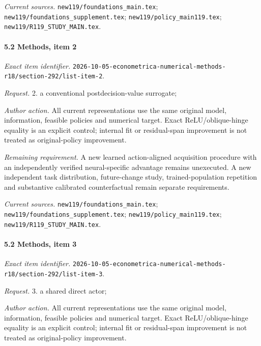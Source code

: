 \par\emph{Current sources.} \nolinkurl{new119/foundations_main.tex}; \nolinkurl{new119/foundations_supplement.tex}; \nolinkurl{new119/policy_main119.tex}; \nolinkurl{new119/R119_STUDY_MAIN.tex}.

\paragraph{5.2 Methods, item 2}

\emph{Exact item identifier.} \nolinkurl{2026-10-05-econometrica-numerical-methods-r18/section-292/list-item-2}.

\par\emph{Request.} 2. a conventional postdecision-value surrogate;

\par\emph{Author action.} All current representations use the same original model, information, feasible policies and numerical target. Exact ReLU/\allowbreak{}oblique-hinge equality is an explicit control; internal fit or residual-span improvement is not treated as original-policy improvement.

\par\emph{Remaining requirement.} A new learned action-aligned acquisition procedure with an independently verified neural-specific advantage remains unexecuted. A new independent task distribution, future-change study, trained-population repetition and substantive calibrated counterfactual remain separate requirements.

\par\emph{Current sources.} \nolinkurl{new119/foundations_main.tex}; \nolinkurl{new119/foundations_supplement.tex}; \nolinkurl{new119/policy_main119.tex}; \nolinkurl{new119/R119_STUDY_MAIN.tex}.

\paragraph{5.2 Methods, item 3}

\emph{Exact item identifier.} \nolinkurl{2026-10-05-econometrica-numerical-methods-r18/section-292/list-item-3}.

\par\emph{Request.} 3. a shared direct actor;

\par\emph{Author action.} All current representations use the same original model, information, feasible policies and numerical target. Exact ReLU/\allowbreak{}oblique-hinge equality is an explicit control; internal fit or residual-span improvement is not treated as original-policy improvement.

